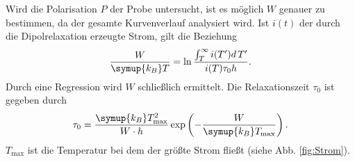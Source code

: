 Wird die Polarisation $P$ der Probe untersucht, ist es möglich $W$ genauer zu bestimmen, da der gesamte Kurvenverlauf analysiert wird.
Ist $i(t)$ der durch die Dipolrelaxation erzeugte Strom, gilt die Beziehung
\begin{equation}
    \frac{W}{\symup{k_B}T}=\ln\frac{\int_T^\infty i(T')d\,T'}{i(T)\tau_0 h}.
\end{equation}
Durch eine Regression wird $W$ schließlich ermittelt.
Die Relaxationszeit $\tau_0$ ist gegeben durch
\begin{equation}
    \label{eqn:tau0}
    \tau_0 = \frac{\symup{k_B}T_\text{max}^2}{W \cdot h} \exp\left(-\frac{W}{\symup{k_B}T_\text{max}} \right).
\end{equation}
$T_\text{max}$ ist die Temperatur bei dem der größte Strom fließt (siehe Abb. \ref{fig:Strom}). 


\FloatBarrier